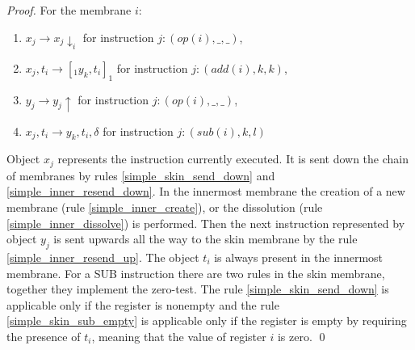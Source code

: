 \documentclass[submission,copyright,creativecommons]{../lib/lncs/llncs}
\begin{document}
\begin{proof}
  For the membrane $i$:
  \begin{enumerate}[resume]
    \item\label{simple_inner_resend_down} $x_j \rightarrow x_j\downarrow_{i}$ for instruction $j: (op(i), \_, \_)$,
    \item\label{simple_inner_create} $x_j, t_i \rightarrow [_1 y_k, t_i ]_1$ for instruction $j: (add(i), k, k)$,
    \item\label{simple_inner_resend_up} $y_j \rightarrow y_j\uparrow$ for instruction $j: (op(i), \_, \_)$,
    \item\label{simple_inner_dissolve} $x_j, t_i \rightarrow y_k, t_i, \delta$ for instruction $j: (sub(i), k, l)$
  \end{enumerate}

  Object $x_j$ represents the instruction currently executed. It is sent down the chain of membranes by rules \ref{simple_skin_send_down} and \ref{simple_inner_resend_down}. In the innermost membrane the creation of a new membrane (rule \ref{simple_inner_create}), or the dissolution (rule \ref{simple_inner_dissolve}) is performed. Then the next instruction represented by object $y_j$ is sent upwards all the way to the skin membrane by the rule \ref{simple_inner_resend_up}. The object $t_i$ is always present in the innermost membrane. For a SUB instruction there are two rules in the skin membrane, together they implement the zero-test. The rule \ref{simple_skin_send_down} is applicable only if the register is nonempty and the rule \ref{simple_skin_sub_empty} is applicable only if the register is empty by requiring the presence of $t_i$, meaning that the value of register $i$ is zero. \qed
\end{proof}
\end{document}
